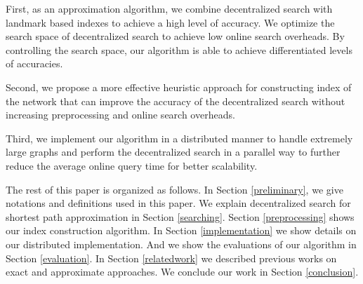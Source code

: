 First, as an approximation algorithm, we combine decentralized search with landmark based indexes to achieve a high level of accuracy. We optimize the search space of decentralized search to achieve low online search overheads. By controlling the search space, our algorithm is able to achieve differentiated levels of accuracies.

Second, we propose a more effective heuristic approach for constructing index of the network that can improve the accuracy of the decentralized search without increasing preprocessing and online search overheads.

Third, we implement our algorithm in a distributed manner to handle extremely large graphs and perform the decentralized search in a parallel way to further reduce the average online query time for better scalability.

The rest of this paper is organized as follows. In Section \ref{preliminary}, we give notations and definitions used in this paper. We explain decentralized search for shortest path approximation in Section \ref{searching}. Section \ref{preprocessing} shows our index construction algorithm. In Section \ref{implementation} we show details on our distributed implementation. And we show the evaluations of our algorithm in Section \ref{evaluation}. In Section \ref{relatedwork} we described previous works on exact and approximate approaches. We conclude our work in Section \ref{conclusion}.
